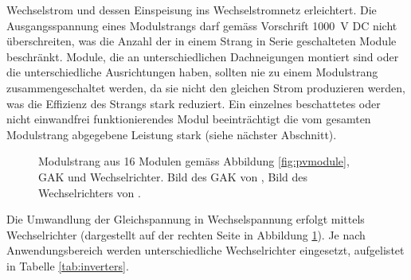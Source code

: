 \noindent   Wechselstrom   und   dessen   Einspeisung   ins   Wechselstromnetz
erleichtert. Die Ausgangsspannung eines  Modulstrangs darf gem\"ass Vorschrift
\SI{1000}{\volt} DC nicht \"uberschreiten, was  die Anzahl der in einem Strang
in Serie  geschalteten Module beschr\"ankt.  Module,  die an unterschiedlichen
Dachneigungen  montiert sind  oder die  unterschiedliche Ausrichtungen  haben,
sollten nie zu  einem Modulstrang zusammengeschaltet werden, da  sie nicht den
gleichen  Strom  produzieren  werden,  was die  Effizienz  des  Strangs  stark
reduziert. Ein einzelnes beschattetes  oder nicht einwandfrei funktionierendes
Modul beeintr\"achtigt die vom  gesamten Modulstrang abgegebene Leistung stark
(siehe n\"achster Abschnitt).

\clearpage
\enlargethispage{2em}
\begin{figure}[h!t]
    \centering
    \caption[Modulstrang, \"Ubersichtsbild]{%
        Modulstrang aus 16 Modulen  gem\"ass Abbildung \ref{fig:pvmodule}, GAK
        und Wechselrichter. Bild des GAK  von \cite{ref:gak:gantner}, Bild des
        Wechselrichters von \cite{ref:inverter:sunnyboy}.%
    }
    \label{fig:pvarray:gak:inverter}
\end{figure}

Die    Umwandlung    der    Gleichspannung    in    Wechselspannung    erfolgt
mittels    Wechselrichter   (dargestellt    auf   der    rechten   Seite    in
Abbildung  \ref{fig:pvarray:gak:inverter}). Je  nach Anwendungsbereich  werden
unterschiedliche   Wechselrichter    eingesetzt,   aufgelistet    in   Tabelle
\ref{tab:inverters}.

